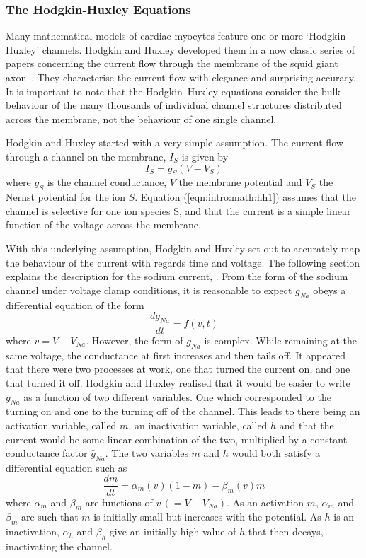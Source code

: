 \subsubsection{The Hodgkin-Huxley Equations}

Many mathematical models of cardiac myocytes feature one or more
`Hodgkin--Huxley' channels.
Hodgkin and Huxley developed them in a now classic series of papers concerning
the current flow through the membrane of the squid giant
axon~\cite{Hodgkin1952,Keener1998}.
They characterise the current flow with elegance and surprising accuracy.
It is important to note that the Hodgkin--Huxley equations consider the bulk
behaviour of the many thousands of individual channel structures distributed
across the membrane, not the behaviour of one single channel.

Hodgkin and Huxley started with a very simple assumption.
The current flow through a channel on the membrane, $I_{S}$ is given by
\begin{equation}
I_{S} = g_{S}\left(V-V_{S}\right)
\label{eqn:intro:math:hh1}
\end{equation}
where $g_{S}$ is the channel conductance, $V$ the membrane potential and $V_{S}$
the Nernst potential for the ion $S$.
Equation (\ref{eqn:intro:math:hh1}) assumes that the channel is selective for
one ion species S, and that the current is a simple linear function of the
voltage across the membrane.

With this underlying assumption, Hodgkin and Huxley set out to accurately map
the behaviour of the current with regards time and voltage.
The following section explains the description for the sodium current, .
From the form of the sodium channel under voltage clamp conditions, it is
reasonable to expect $g_{Na}$ obeys a differential equation of the form
\begin{equation}
\frac{dg_{Na}}{dt} = f\left(v,t\right)
\label{eqn:intro:math:hh2}
\end{equation}
where $v=V-V_{Na}$.
However, the form of $g_{Na}$ is complex.
While remaining at the same voltage, the conductance at first increases and then
tails off.
It appeared that there were two processes at work, one that turned the current
on, and one that turned it off.
Hodgkin and Huxley realised that it would be easier to write $g_{Na}$ as a
function of two different variables.
One which corresponded to the turning on and one to the turning off of the
channel.
This leads to there being an activation variable, called $m$, an inactivation
variable, called $h$ and that the current would be some linear combination of the
two, multiplied by a constant conductance factor $\bar{g}_{Na}$.
The two variables $m$ and $h$ would both satisfy a differential equation such as
\begin{equation}
\frac{dm}{dt}=\alpha_{m}\left(v\right)\left(1-m\right) -
\beta_{m}\left(v\right)m
\label{eqn:intro:math:dmdt}
\end{equation}
where $\alpha_{m}$ and $\beta_{m}$ are functions of $v\,\left(=V-V_{Na}\right)$.
As an activation $m$, $\alpha_{m}$ and $\beta_{m}$ are such that $m$ is
initially small but increases with the potential.
As $h$ is an inactivation, $\alpha_{h}$ and $\beta_{h}$ give an initially high
value of $h$ that then decays, inactivating the channel.

